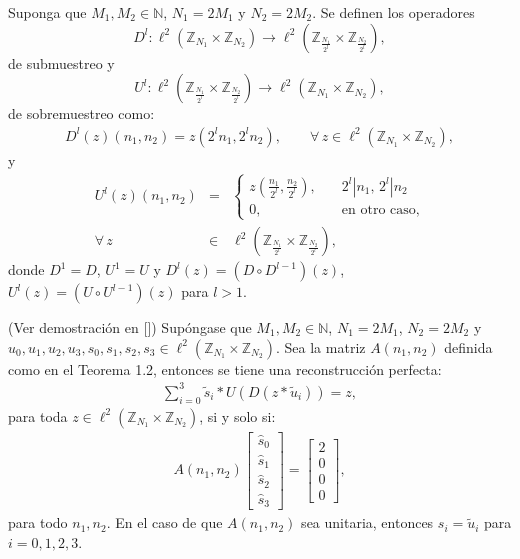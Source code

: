\begin{definition}
Suponga que $M_1,M_2\in\mathbb{N}$, $N_1=2M_1$ y $N_2=2M_2$. Se definen los operadores $$D^l: \ell^2(\mathbb{Z}_{N_1}\times\mathbb{Z}_{N_2})\rightarrow \ell^2\left(\mathbb{Z}_{\frac{N_1}{2^l}}\times\mathbb{Z}_{\frac{N_2}{2^l}}\right),$$ de submuestreo y $$U^l: \ell^2\left(\mathbb{Z}_{\frac{N_1}{2^l}}\times\mathbb{Z}_{\frac{N_2}{2^l}}\right)\rightarrow \ell^2(\mathbb{Z}_{N_1}\times\mathbb{Z}_{N_2}),$$ de sobremuestreo como:
\begin{eqnarray}
D^l(z)(n_1,n_2)=z(2^ln_1,2^ln_2),\qquad\forall\,z\in \ell^2(\mathbb{Z}_{N_1}\times\mathbb{Z}_{N_2}),\nonumber
\end{eqnarray}
y
\begin{eqnarray}
U^l(z)(n_1,n_2)&=&\left\{\begin{array}{rr}
z\left(\frac{n_1}{2^l},\frac{n_2}{2^l}\right),&\quad 2^l | n_1,\, 2^l|n_2\\
0,&\quad\mbox{en otro caso,}
\end{array}\right.\nonumber\\
\forall\,z&\in &\ell^2\left(\mathbb{Z}_{\frac{N_1}{2^l}}\times\mathbb{Z}_{\frac{N_2}{2^l}}\right),\nonumber
\end{eqnarray}
donde $D^1=D$, $U^1=U$ y $D^l(z)=(D\circ D^{l-1})(z)$, $U^l(z)=(U\circ U^{l-1})(z)$ para $l>1$.
\end{definition}

\begin{theorem}
(Ver demostraci\'on en [\textcolor{cyan}{\cite{12}}]) Sup\'ongase que $M_1,M_2\in\mathbb{N}$, $N_1=2M_1$, $N_2=2M_2$ y $u_0,u_1,u_2,u_3,s_0,s_1,s_2,s_3\in \ell^2(\mathbb{Z}_{N_1}\times\mathbb{Z}_{N_2})$. Sea la matriz $A(n_1,n_2)$ definida como en el Teorema 1.2, entonces se tiene una reconstrucci\'on perfecta:
\begin{eqnarray}
\sum_{i=0}^3 \tilde{s}_i\ast U(D(z\ast\tilde{u}_i))=z,\nonumber
\end{eqnarray}
para toda $z\in \ell^2(\mathbb{Z}_{N_1}\times\mathbb{Z}_{N_2})$, si y solo si:
\begin{eqnarray}
A(n_1,n_2)\left[\begin{array}{c}
\hat{s}_0\\ \hat{s}_1\\ \hat{s}_2\\ \hat{s}_3
\end{array}\right]=\left[\begin{array}{c}
2\\0\\0\\0
\end{array}\right],\nonumber
\end{eqnarray}
para todo $n_1,n_2$. En el caso de que $A(n_1,n_2)$ sea unitaria, entonces $s_i=\tilde{u}_i$ para $i=0,1,2,3$.
\label{reconstruccion-perfecta}
\end{theorem}

